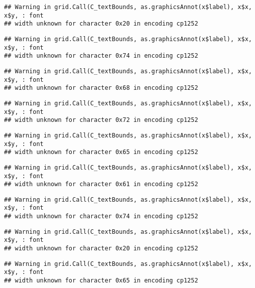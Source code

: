 \documentclass[
]{article}
\begin{document}
\begin{verbatim}
## Warning in grid.Call(C_textBounds, as.graphicsAnnot(x$label), x$x, x$y, : font
## width unknown for character 0x20 in encoding cp1252
\end{verbatim}

\begin{verbatim}
## Warning in grid.Call(C_textBounds, as.graphicsAnnot(x$label), x$x, x$y, : font
## width unknown for character 0x74 in encoding cp1252
\end{verbatim}

\begin{verbatim}
## Warning in grid.Call(C_textBounds, as.graphicsAnnot(x$label), x$x, x$y, : font
## width unknown for character 0x68 in encoding cp1252
\end{verbatim}

\begin{verbatim}
## Warning in grid.Call(C_textBounds, as.graphicsAnnot(x$label), x$x, x$y, : font
## width unknown for character 0x72 in encoding cp1252
\end{verbatim}

\begin{verbatim}
## Warning in grid.Call(C_textBounds, as.graphicsAnnot(x$label), x$x, x$y, : font
## width unknown for character 0x65 in encoding cp1252
\end{verbatim}

\begin{verbatim}
## Warning in grid.Call(C_textBounds, as.graphicsAnnot(x$label), x$x, x$y, : font
## width unknown for character 0x61 in encoding cp1252
\end{verbatim}

\begin{verbatim}
## Warning in grid.Call(C_textBounds, as.graphicsAnnot(x$label), x$x, x$y, : font
## width unknown for character 0x74 in encoding cp1252
\end{verbatim}

\begin{verbatim}
## Warning in grid.Call(C_textBounds, as.graphicsAnnot(x$label), x$x, x$y, : font
## width unknown for character 0x20 in encoding cp1252
\end{verbatim}

\begin{verbatim}
## Warning in grid.Call(C_textBounds, as.graphicsAnnot(x$label), x$x, x$y, : font
## width unknown for character 0x65 in encoding cp1252
\end{verbatim}
\end{document}
